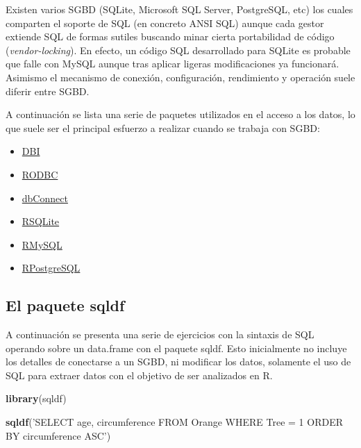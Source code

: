 \documentclass[]{book}
\newenvironment{Shaded}{\begin{snugshade}}{\end{snugshade}}
\newcommand{\KeywordTok}[1]{\textcolor[rgb]{0.13,0.29,0.53}{\textbf{#1}}}
\newcommand{\StringTok}[1]{\textcolor[rgb]{0.31,0.60,0.02}{#1}}
\newcommand{\NormalTok}[1]{#1}
\providecommand{\tightlist}{%
  \setlength{\itemsep}{0pt}\setlength{\parskip}{0pt}}
\begin{document}
Existen varios SGBD (SQLite, Microsoft SQL Server, PostgreSQL, etc) los
cuales comparten el soporte de SQL (en concreto ANSI SQL) aunque cada
gestor extiende SQL de formas sutiles buscando minar cierta portabilidad
de código (\emph{vendor-locking}). En efecto, un código SQL desarrollado
para SQLite es probable que falle con MySQL aunque tras aplicar ligeras
modificaciones ya funcionará. Asimismo el mecanismo de conexión,
configuración, rendimiento y operación suele diferir entre SGBD.

A continuación se lista una serie de paquetes utilizados en el acceso a
los datos, lo que suele ser el principal esfuerzo a realizar cuando se
trabaja con SGBD:

\begin{itemize}
\tightlist
\item
  \href{https://cran.r-project.org/web/packages/DBI/index.html}{DBI}
\item
  \href{https://cran.r-project.org/web/packages/RODBC/index.html}{RODBC}
\item
  \href{https://cran.r-project.org/web/packages/dbConnect/index.html}{dbConnect}
\item
  \href{https://cran.r-project.org/web/packages/RSQLite/index.html}{RSQLite}
\item
  \href{https://cran.r-project.org/web/packages/RMySQL/index.html}{RMySQL}
\item
  \href{https://cran.r-project.org/web/packages/RPostgreSQL/index.html}{RPostgreSQL}
\end{itemize}

\subsection{El paquete sqldf}\label{el-paquete-sqldf}

A continuación se presenta una serie de ejercicios con la sintaxis de
SQL operando sobre un data.frame con el paquete sqldf. Esto inicialmente
no incluye los detalles de conectarse a un SGBD, ni modificar los datos,
solamente el uso de SQL para extraer datos con el objetivo de ser
analizados en R.

\begin{Shaded}
\begin{Highlighting}[]
\KeywordTok{library}\NormalTok{(sqldf)}
\end{Highlighting}
\end{Shaded}

\begin{Shaded}
\begin{Highlighting}[]
\KeywordTok{sqldf}\NormalTok{(}\StringTok{'SELECT age, circumference FROM Orange WHERE Tree = 1 ORDER BY circumference ASC'}\NormalTok{)}
\end{Highlighting}
\end{Shaded}
\end{document}
